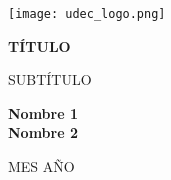\begin{titlepage}
    \centering
    \vspace*{2cm} %

    \texttt{[image: udec\_logo.png]}

    \vspace{2cm} %

    {\huge \textbf{TÍTULO}}

    \vspace{0.5cm}

    {\Large SUBTÍTULO} %

    \vfill
    
    \textbf{Nombre 1} \\
    \textbf{Nombre 2}

    \vspace{1cm}

    \normalsize MES AÑO

    \vspace{2cm} %
\end{titlepage}

\setcounter{page}{1}  %
